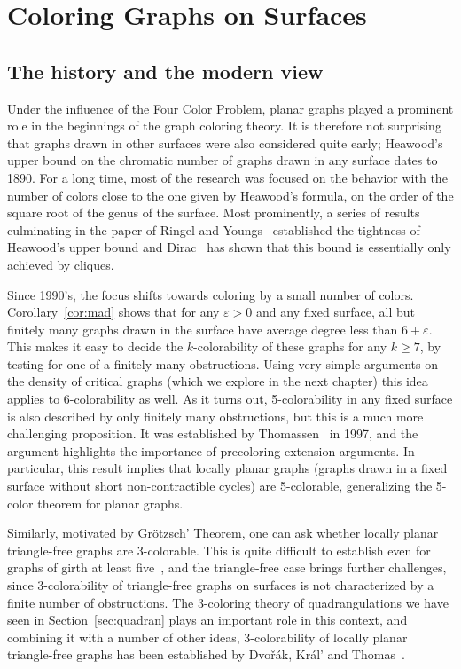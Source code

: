 \documentclass[12pt,twoside,openright,a4paper]{book}
\begin{document}
\part{Coloring Graphs on Surfaces}

\chapter{The history and the modern view}

Under the influence of the Four Color Problem, planar graphs played a prominent role in the beginnings of the graph coloring theory.
It is therefore not surprising that graphs drawn in other surfaces were also considered quite early; Heawood's upper bound
on the chromatic number of graphs drawn in any surface dates to 1890.  For a long time, most of the research was focused
on the behavior with the number of colors close to the one given by Heawood's formula, on the order of the square root of the genus
of the surface.  Most prominently, a series of results culminating in the paper of Ringel and Youngs~\cite{ringel} established the tightness of Heawood's
upper bound and Dirac~\cite{dirac1952} has shown that this bound is essentially only achieved by cliques.

Since 1990's, the focus shifts towards coloring by a small number of colors.  Corollary~\ref{cor:mad} shows that for any $\varepsilon>0$ and any fixed surface,
all but finitely many graphs drawn in the surface have average degree less than $6+\varepsilon$.  This makes it easy to decide the $k$-colorability
of these graphs for any $k\ge 7$, by testing for one of a finitely many obstructions.  Using very simple arguments on the density of critical graphs
(which we explore in the next chapter) this idea applies to $6$-colorability as well.  As it turns out, 5-colorability in any fixed surface is also described
by only finitely many obstructions, but this is a much more challenging proposition.  It was established by Thomassen~\cite{Thomassen97} in 1997,
and the argument highlights the importance of precoloring extension arguments.  In particular, this result implies that locally planar graphs
(graphs drawn in a fixed surface without short non-contractible cycles) are 5-colorable, generalizing the 5-color theorem for planar graphs.

Similarly, motivated by Gr\"{o}tzsch' Theorem, one can ask whether locally planar triangle-free graphs are 3-colorable.  This is quite difficult to establish
even for graphs of girth at least five~\cite{thomassen-surf}, and the triangle-free case brings further challenges, since 3-colorability of triangle-free
graphs on surfaces is not characterized by a finite number of obstructions.  The 3-coloring theory of quadrangulations we have seen in Section~\ref{sec:quadran}
plays an important role in this context, and combining it with a number of other ideas, 3-colorability of locally planar triangle-free graphs has been established
by Dvo\v{r}\'ak, Kr\'al' and Thomas~\cite{trfree6}.
\end{document}
